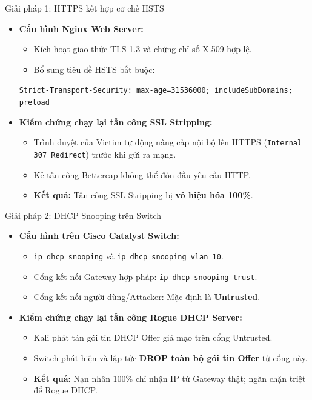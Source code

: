 \documentclass[fleqn]{beamer}
\begin{document}
\begin{frame}{Giải pháp 1: HTTPS kết hợp cơ chế HSTS}
  \begin{itemize}
    \item \textbf{Cấu hình Nginx Web Server:}
      \begin{itemize}
        \item Kích hoạt giao thức TLS 1.3 và chứng chỉ số X.509 hợp lệ.
        \item Bổ sung tiêu đề HSTS bắt buộc:
      \end{itemize}
      \texttt{Strict-Transport-Security: max-age=31536000; includeSubDomains; preload}
    \item \textbf{Kiểm chứng chạy lại tấn công SSL Stripping:}
      \begin{itemize}
        \item Trình duyệt của Victim tự động nâng cấp nội bộ lên HTTPS (\texttt{Internal 307 Redirect}) trước khi gửi ra mạng.
        \item Kẻ tấn công Bettercap không thể đón đầu yêu cầu HTTP.
        \item \textbf{Kết quả:} Tấn công SSL Stripping bị \textbf{vô hiệu hóa 100\%}.
      \end{itemize}
  \end{itemize}
\end{frame}

\begin{frame}{Giải pháp 2: DHCP Snooping trên Switch}
  \begin{itemize}
    \item \textbf{Cấu hình trên Cisco Catalyst Switch:}
      \begin{itemize}
        \item \texttt{ip dhcp snooping} và \texttt{ip dhcp snooping vlan 10}.
        \item Cổng kết nối Gateway hợp pháp: \texttt{ip dhcp snooping trust}.
        \item Cổng kết nối người dùng/Attacker: Mặc định là \textbf{Untrusted}.
      \end{itemize}
    \item \textbf{Kiểm chứng chạy lại tấn công Rogue DHCP Server:}
      \begin{itemize}
        \item Kali phát tán gói tin DHCP Offer giả mạo trên cổng Untrusted.
        \item Switch phát hiện và lập tức \textbf{DROP toàn bộ gói tin Offer} từ cổng này.
        \item \textbf{Kết quả:} Nạn nhân 100\% chỉ nhận IP từ Gateway thật; ngăn chặn triệt để Rogue DHCP.
      \end{itemize}
  \end{itemize}
\end{frame}
\end{document}
